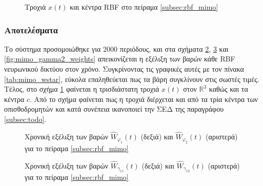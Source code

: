 {
\begin{figure}
	
	\captionsetup{format=plain}
	\caption{Τροχιά $x(t)$ και κέντρα RBF στο πείραμα \ref{subsec:rbf_mimo}}
	\label{fig:phase_plain_mimo}	
\end{figure}
\subsubsection{Αποτελέσματα}
Το σύστημα προσομοιώθηκε για 2000 περιόδους, και στα σχήματα \ref{fig:mimo_phi_weights}, \ref{fig:mimo_gamma1_weights} και \ref{fig:mimo_gamma2_weights} απεικονίζεται η εξέλιξη των βαρών κάθε RBF νευρωνικού δικτύου στον χρόνο. Συγκρίνοντας τις γραφικές αυτές με τον πίνακα \ref{tab:mimo_wstar}, εύκολα επαληθεύεται πως τα βάρη συγκλίνουν στις σωστές τιμές. Τέλος, στο σχήμα \ref{fig:phase_plain_mimo} φαίνεται η τρισδιάστατη τροχιά $x(t)$ στον $\mathbb{R}^3$ καθώς και τα κέντρα $c$. Από το σχήμα φαίνεται πως η τροχιά διέρχεται και από τα τρία κέντρα των οπισθοδρομητών και κατά συνέπεια ικανοποιεί την ΣΕΔ της παραγράφου \ref{subsec:todo}.

}

\begin{figure}
	\begin{subfigure}{0.5\textwidth}
		
	\end{subfigure}
	\begin{subfigure}{0.5\textwidth}
		
	\end{subfigure}
	\caption{ Χρονική εξέλιξη των βαρών $\hat{W}_{\varphi_1}(t)$ (δεξιά) και $\hat{W}_{\varphi_2}(t)$ (αριστερά) για το πείραμα \ref{subsec:rbf_mimo}}
	\label{fig:mimo_phi_weights}
\end{figure}

\begin{figure}
	\begin{subfigure}{0.5\textwidth}
		
	\end{subfigure}
	\begin{subfigure}{0.5\textwidth}
		
	\end{subfigure}
	\caption{ Χρονική εξέλιξη των βαρών $\hat{W}_{\gamma_{11}}(t)$ (δεξιά) και $\hat{W}_{\gamma_{12}}(t)$ (αριστερά) για το πείραμα \ref{subsec:rbf_mimo}}
		\label{fig:mimo_gamma1_weights}
	\end{figure}

